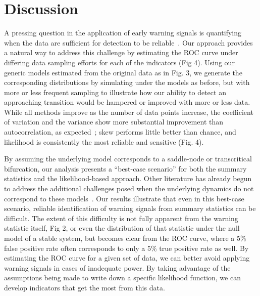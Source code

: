 \documentclass[authoryear,preprint,11pt]{elsarticle}
\begin{document}

\section{Discussion}
A pressing question in the application of early warning signals is quantifying
when the data are sufficient for detection to be reliable~\citep{Scheffer2009, Scheffer2010, Inman2011}. 
Our approach provides a natural way to address this challenge by estimating the ROC curve under differing data sampling efforts
for each of the indicators (Fig 4). 
Using our generic models estimated from the original data as in Fig. 3, 
we generate the corresponding distributions by simulating under the models as before, 
but with more or less frequent sampling to illustrate how our ability to detect an approaching transition 
would be hampered or improved with more or less data.  
While all methods improve as the number of data points increase, 
the coefficient of variation and the variance show more substantial improvement than autocorrelation, 
as expected~\citep{Carpenter2011};⁠
skew performs little better than chance, and likelihood is consistently the most reliable and sensitive (Fig. 4). 

By assuming the underlying model corresponds to a saddle-node or transcritical bifurcation,
our analysis presents a ``best-case scenario'' for both the summary statistics and the likelihood-based approach. 
Other literature has already begun to address the additional challenges posed when the underlying 
dynamics do not correspond to these models~\citep{Hastings2010}.
Our results illustrate that even in this best-case scenario, 
reliable identification of warning signals from summary statistics can be difficult.  
The extent of this difficulty is not fully apparent from the warning statistic itself, Fig 2,
or even the distribution of that statistic under the null model of a stable system, 
but becomes clear from the ROC curve, where a 5\% false positive rate often corresponds to only a 5\% true positive rate as well.  
By estimating the ROC curve for a given set of data, 
we can better avoid applying warning signals in cases of inadequate power.
By taking advantage of the assumptions being made to write down a specific likelihood function,
we can develop indicators that get the most from this data.  
\end{document}
